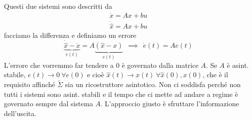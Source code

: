 Questi due sistemi sono descritti da
\begin{gather*}
	\dot{x} =Ax+bu\\
	\dot{\hat{x}} =A\hat{x} +bu
\end{gather*}
facciamo la differenza e definiamo un errore
\begin{equation*}
	\underbrace{\dot{\hat{x}} -\dot{x}}_{\dot{e}(t)} =A\underbrace{(\hat{x} -x)}_{e(t)} \ \ \implies \ \ \dot{e}(t) =Ae(t)
\end{equation*}
L'errore che vorremmo far tendere a $0$ è governato dalla matrice $A$. Se $A$ è asint. stabile, $e(t)\to 0\ \forall e(0)$ e cioè $\hat{x}(t)\to x(t) \ \forall \hat{x}(0) ,x(0)$, che è il requisito affinché $\tilde{\Sigma }$ sia un ricostruttore asintotico. Non ci soddisfa perché non tutti i sistemi sono asint. stabili e il tempo che ci mette ad andare a regime è governato sempre dal sistema $A$. L'approccio giusto è sfruttare l'informazione dell'uscita.

